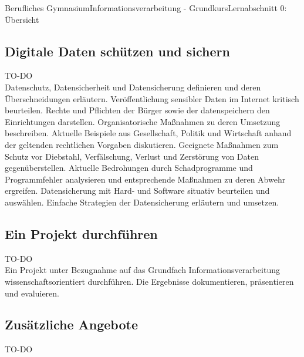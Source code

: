 \documentclass[11pt,oneside,openany,headings=optiontotoc,11pt,numbers=noenddot]{article}
\begin{document}
\begin{worksheet}{Berufliches Gymnasium}{Informationsverarbeitung - Grundkurs}{Lernabschnitt 0: Übersicht}
		\subsection{Digitale Daten schützen und sichern}
		\LARGE{TO-DO}\normalsize\\
		Datenschutz, Datensicherheit und Datensicherung definieren und deren Überschneidungen erläutern.
		Veröffentlichung sensibler Daten im Internet kritisch beurteilen.
		Rechte und Pflichten der Bürger sowie der datenspeichern den Einrichtungen darstellen. Organisatorische
		Maßnahmen zu deren Umsetzung beschreiben. Aktuelle Beispiele aus Gesellschaft,
		Politik und Wirtschaft anhand der geltenden rechtlichen Vorgaben diskutieren.
		Geeignete Maßnahmen zum Schutz vor Diebstahl, Verfälschung, Verlust und Zerstörung von
		Daten gegenüberstellen.
		Aktuelle Bedrohungen durch Schadprogramme und Programmfehler analysieren und entsprechende
		Maßnahmen zu deren Abwehr ergreifen.
		Datensicherung mit Hard- und Software situativ beurteilen und auswählen. Einfache Strategien
		der Datensicherung erläutern und umsetzen.
		\subsection{Ein Projekt durchführen}
		\LARGE{TO-DO}\normalsize\\
		Ein Projekt unter Bezugnahme auf das Grundfach Informationsverarbeitung wissenschaftsorientiert
		durchführen. Die Ergebnisse dokumentieren, präsentieren und evaluieren.
		\subsection*{Zusätzliche Angebote}
		\LARGE{TO-DO}\normalsize\\
	\end{worksheet}
\end{document}
